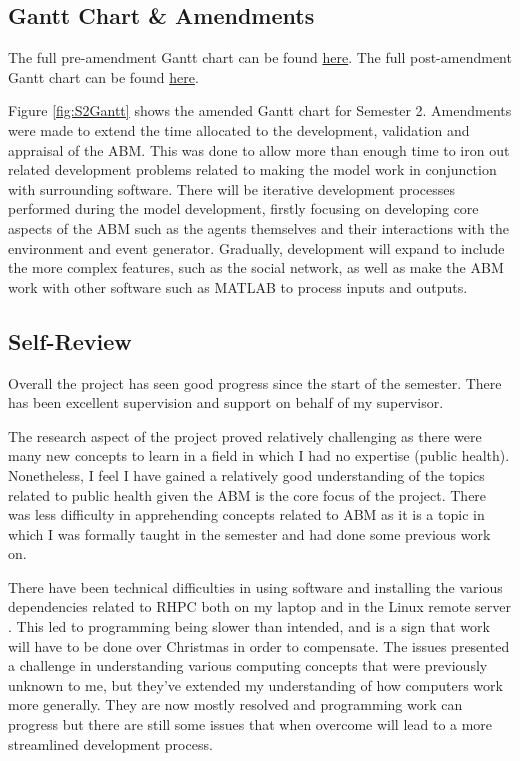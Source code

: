 \subsection{Gantt Chart \& Amendments}
The full pre-amendment Gantt chart can be found \href{https://www.notion.so/zuddas/9c097f57d9d844da8fc7f8733b38289f?v=61d021af0d9d40ebab7b2a6fbe6b3bd8}{here}. 
The full post-amendment Gantt chart can be found \href{https://www.notion.so/zuddas/ee42fe3d801947d08c59b69aa2e4f0cd?v=13936a7a4a4a4cff9e9fc01ff24508cb}{here}. 

Figure \ref{fig:S2Gantt} shows the amended Gantt chart for Semester 2. Amendments were made to extend the time allocated to the development, validation and appraisal of the \ac{ABM}. This was done to allow more than enough time to iron out related development problems related to making the model work in conjunction with surrounding software. There will be iterative development processes performed during the model development, firstly focusing on developing core aspects of the \ac{ABM} such as the agents themselves and their interactions with the environment and event generator. Gradually, development will expand to include the more complex features, such as the social network, as well as make the \ac{ABM} work with other software such as MATLAB to process inputs and outputs. 



\subsection{Self-Review}


Overall the project has seen good progress since the start of the semester. There has been excellent supervision and support on behalf of my supervisor. 

The research aspect of the project proved relatively challenging as there were many new concepts to learn in a field in which I had no expertise (public health). Nonetheless, I feel I have gained a relatively good understanding of the topics related to public health given the \ac{ABM} is the core focus of the project. There was less difficulty in apprehending concepts related to \ac{ABM} as it is a topic in which I was formally taught in the semester and had done some previous work on. 

There have been technical difficulties in using software and installing the various dependencies related to \ac{RHPC} both on my laptop and in the Linux remote server \cite{repasthpc}. This led to programming being slower than intended, and is a sign that work will have to be done over Christmas in order to compensate. The issues presented a challenge in understanding various computing concepts that were previously unknown to me, but they've extended my understanding of how computers work more generally. They are now mostly resolved and programming work can progress but there are still some issues that when overcome will lead to a more streamlined development process. 